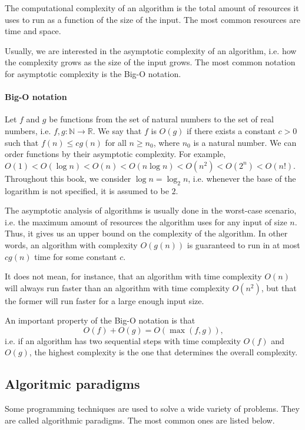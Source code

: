 The computational complexity of an algorithm is the total amount of resources it uses to
run as a function of the size of the input.  The most common resources are time and
space.

Usually, we are interested in the asymptotic complexity of an algorithm, i.e. how
the complexity grows as the size of the input grows.  The most common notation for
asymptotic complexity is the Big-O notation.

\paragraph{Big-O notation}  Let $f$ and $g$ be functions from the set of natural numbers
to the set of real numbers, i.e. $f, g : \mathbb{N} \rightarrow \mathbb{R}$.  We say that $f$ is
$O(g)$ if there exists a constant $c > 0$ such that $f(n) \leq c g(n)$ for all $n \geq
n_0$, where $n_0$ is a natural number.
We can order functions by their asymptotic complexity.  For example, $O(1) < O(\log n) <
O(n) < O(n \log n) < O(n^2) < O(2^n) < O(n!)$.  Throughout this book, we consider
$\log n = \log_2 n$, i.e. whenever the base of the logarithm is not specified, it is
assumed to be $2$.

The asymptotic analysis of algorithms is usually done in the worst-case scenario, i.e.
the maximum amount of resources the algorithm uses for any input of size $n$.  Thus,
it gives us an upper bound on the complexity of the algorithm.  In other words, an
algorithm with complexity $O(g(n))$ is guaranteed to run in at most $c g(n)$ time for some
constant $c$.

It does not mean, for instance, that an algorithm with time complexity $O(n)$ will always run
faster than an algorithm with time complexity $O(n^2)$, but that the former will run faster
for a large enough input size.

An important property of the Big-O notation is that
\[
  O(f) + O(g) = O(\max(f, g))\text{,}
\]
i.e. if an algorithm has two sequential steps with time complexity $O(f)$ and $O(g)$, the
highest complexity is the one that determines the overall complexity.

\subsection{Algoritmic paradigms}

Some programming techniques are used to solve a wide variety of problems.  They are called
algorithmic paradigms.  The most common ones are listed below.

